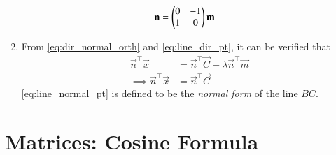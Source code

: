 \begin{enumerate}[label=\thesection.\arabic*.,ref=\thesection.\theenumi]
\begin{align}
\mathbf{n} &= \begin{pmatrix}0 & -1 \\ 1 & 0\end{pmatrix}\mathbf{m}
\end{align}
%
\item 
From \eqref{eq:dir_normal_orth} and \eqref{eq:line_dir_pt}, 
it can be verified that 
%
\begin{align}
\vec{n}^{\top}\vec{x} &= \vec{n}^{\top}\vec{C} + \lambda \vec{n}^{\top}\vec{m}
\\
\implies \vec{n}^{\top}\vec{x} &= \vec{n}^{\top}\vec{C}
\label{eq:line_normal_pt}
\end{align}
%
\eqref{eq:line_normal_pt} is defined to be the {\em normal form} of the line $BC$.  
\end{enumerate}
\section{Matrices: Cosine Formula}
